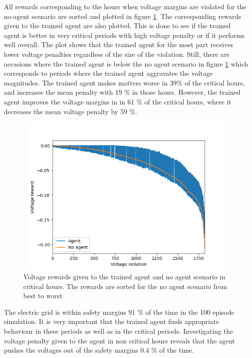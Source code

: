 \documentclass[class=book, crop=false]{standalone}
\begin{document}
All rewards corresponding to the hours when voltage margins are violated for the no-agent scenario are sorted and plotted in figure \ref{fig:results:config1_sorted_voltage}. The corresponding rewards given to the trained agent are also plotted. This is done to see if the trained agent is better in very critical periods with high voltage penalty or if it performs well overall. The plot shows that the trained agent for the most part receives lower voltage penalties regardless of the size of the violation. Still, there are occasions where the trained agent is below the no agent scenario in figure \ref{fig:results:config1_sorted_voltage} which corresponds to periods where the trained agent aggravates the voltage magnitudes. The trained agent makes matters worse in 39\% of the critical hours, and increases the mean penalty with 19 \% in those hours. However, the trained agent improves the voltage margins in in 61 \% of the critical hours, where it decreases the mean voltage penalty by 59 \%.



\begin{figure}[ht]
    \center
\includegraphics[height=8cm, width=12cm]{figures/config1_sorted_voltage.png}
    \caption[size = 9]{Voltage rewards given to the trained agent and no agent scenario in critical hours. The rewards are sorted for the no agent scenario from best to worst}
    \label{fig:results:config1_sorted_voltage}
\end{figure}


The electric grid is within safety margins 91 \% of the time in the 100 episode simulation. It is very important that the trained agent finds appropriate behaviour in these periods as well as in the critical periods. Investigating the voltage penalty given to the agent in non critical hours reveals that the agent pushes the voltages out of the safety margins 0.4 \% of the time.
\end{document}
